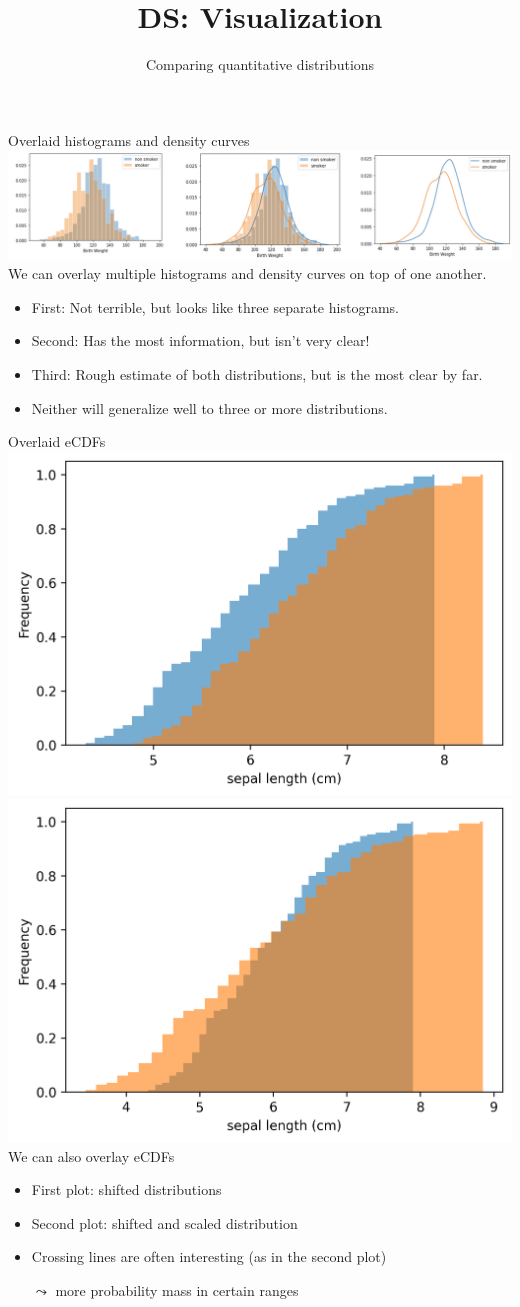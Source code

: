 \documentclass[aspectratio=169]{../latex_main/tntbeamer}  %
\title[Visualization]{DS: Visualization}
\subtitle{Comparing quantitative distributions}
\begin{document}
	
	\maketitle
	\begin{frame}{Overlaid histograms and density curves}
	    \includegraphics[scale=.35]{Bild42}\\
	    We can overlay multiple histograms and density curves on top of one another.
	    \begin{itemize}
	        \item First: Not terrible, but looks like three separate histograms.
	        \item Second: Has the most information, but isn’t very clear!
	        \item Third: Rough estimate of both distributions, but is the most clear by far.
	        \item Neither will generalize well to three or more distributions.
	    \end{itemize}
    \end{frame}
    
    \begin{frame}{Overlaid eCDFs}
        \includegraphics[width=.45\textwidth]{./figure/cdf_iris_sepal_length_shifted.png}
	    \includegraphics[width=.45\textwidth]{./figure/cdf_iris_sepal_length_shifted_scaled.png}\\
	    
	    We can also overlay eCDFs
	    \begin{itemize}
	        \item First plot: shifted distributions
	        \item Second plot: shifted and scaled distribution
	        \item Crossing lines are often interesting (as in the second plot)
	        \item[$\leadsto$] more probability mass in certain ranges
	    \end{itemize}
    \end{frame}
	
\end{document}
